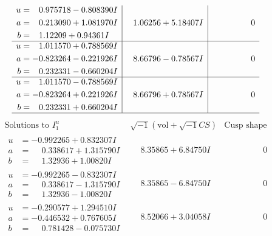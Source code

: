 \documentclass[1p]{elsarticle_modified}
\theoremstyle{definition}
\newcommand{\I}{\sqrt{-1}}
\begin{document}
$$\begin{array}{c|c|c}
\begin{aligned}
u &= \phantom{-}0.975718 - 0.808390 I \\
a &= \phantom{-}0.213090 + 1.081970 I \\
b &= \phantom{-}1.12209 + 0.94361 I\end{aligned}
 & \phantom{-}1.06256 + 5.18407 I & \phantom{-0.000000 } 0 \\ \hline\begin{aligned}
u &= \phantom{-}1.011570 + 0.788569 I \\
a &= -0.823264 - 0.221926 I \\
b &= \phantom{-}0.232331 - 0.660204 I\end{aligned}
 & \phantom{-}8.66796 - 0.78567 I & \phantom{-0.000000 } 0 \\ \hline\begin{aligned}
u &= \phantom{-}1.011570 - 0.788569 I \\
a &= -0.823264 + 0.221926 I \\
b &= \phantom{-}0.232331 + 0.660204 I\end{aligned}
 & \phantom{-}8.66796 + 0.78567 I & \phantom{-0.000000 } 0\\
 \hline 
 \end{array}$$\newpage$$\begin{array}{c|c|c}  
\text{Solutions to }I^u_{1}& \I (\text{vol} + \sqrt{-1}CS) & \text{Cusp shape}\\
 \hline 
\begin{aligned}
u &= -0.992265 + 0.832307 I \\
a &= \phantom{-}0.338617 + 1.315790 I \\
b &= \phantom{-}1.32936 + 1.00820 I\end{aligned}
 & \phantom{-}8.35865 + 6.84750 I & \phantom{-0.000000 } 0 \\ \hline\begin{aligned}
u &= -0.992265 - 0.832307 I \\
a &= \phantom{-}0.338617 - 1.315790 I \\
b &= \phantom{-}1.32936 - 1.00820 I\end{aligned}
 & \phantom{-}8.35865 - 6.84750 I & \phantom{-0.000000 } 0 \\ \hline\begin{aligned}
u &= -0.290577 + 1.294510 I \\
a &= -0.446532 + 0.767605 I \\
b &= \phantom{-}0.781428 - 0.075730 I\end{aligned}
 & \phantom{-}8.52066 + 3.04058 I & \phantom{-0.000000 } 0 \\ \hline\begin{aligned}

\end{aligned}
\end{array}$$
\end{document}
